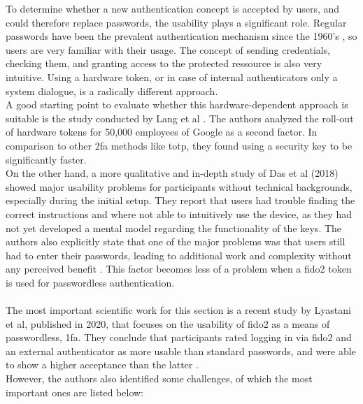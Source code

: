 To determine whether a new authentication concept is accepted by users, and could therefore replace passwords, the usability plays a significant role. Regular passwords have been the prevalent authentication mechanism since the 1960's \cite{mcmillan2012}, so users are very familiar with their usage. The concept of sending credentials, checking them, and granting access to the protected ressource is also very intuitive. Using a hardware token, or in case of internal authenticators only a system dialogue, is a radically different approach.\\
A good starting point to evaluate whether this hardware-dependent approach is suitable is the study conducted by Lang et al \cite{lang2017}. The authors analyzed the roll-out of hardware tokens for 50,000 employees of Google as a second factor. In comparison to other \ac{2fa} methods like \ac{totp}, they found using a security key to be significantly faster.\\
On the other hand, a more qualitative and in-depth study of Das et al (2018) showed major usability problems for participants without technical backgrounds, especially during the initial setup. They report that users had trouble finding the correct instructions and where not able to intuitively use the device, as they had not yet developed a mental model regarding the functionality of the keys. The authors also explicitly state that one of the major problems was that users still had to enter their passwords, leading to additional work and complexity without any perceived benefit \cite{das2018}. This factor becomes less of a problem when a \ac{fido2} token is used for passwordless authentication.\\
\\
The most important scientific work for this section is a recent study by Lyastani et al, published in 2020, that focuses on the usability of \ac{fido2} as a means of passwordless, \ac{1fa}. They conclude that participants rated logging in via \ac{fido2} and an external authenticator as more usable than standard passwords, and were able to show a higher acceptance than the latter \cite{lyastani2020}.\\
However, the authors also identified some challenges, of which the most important ones are listed below:

